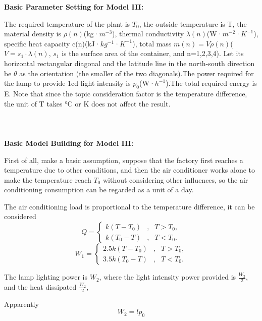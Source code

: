 \textbf{Basic Parameter Setting for Model III:}


The required temperature of the plant is $T_0$, the outside temperature is T, the material density is $\rho(n)$(kg·$m^{-3}$), thermal conductivity $\lambda(n)$(W·$m^{-2}$·$K^{-1}$), specific heat capacity c(n)(kJ·$kg^{-1}$·$K^{-1}$), total mass $m(n)=V\rho(n)$($V=s_1\cdot\lambda(n)$, $s_1$ is the surface area of the container, and n=1,2,3,4). Let its horizontal rectangular diagonal and the latitude line in the north-south direction be $\theta$ as the orientation (the smaller of the two diagonals).The power required for the lamp to provide 1cd light intensity is $p_0$(W·$h^{-1}$).The total required energy is E. Note that since the topic consideration factor is the temperature difference, the unit of T takes °C or K does not affect the result.\\

\\
\\ \hspace*{\fill} \\

\textbf{Basic Model Building for Model III:}


First of all, make a basic assumption, suppose that the factory first reaches a temperature due to other conditions, and then the air conditioner works alone to make the temperature reach $T_0$ without considering other influences, so the air conditioning consumption can be regarded as a unit of a day.

The air conditioning load is proportional to the temperature difference, it can be considered
\begin{equation}\label{e1}
	Q=\left\{
\begin{aligned}\label{el}
k(T-T_0) & , & T>T_0, \\
k(T_0-T) & , & T<T_0.
\end{aligned}
\right.
\end{equation}
\begin{equation}\label{e1}
W_1=\left\{
\begin{aligned}
2.5k(T-T_0) & , & T>T_0, \\
3.5k(T_0-T) & , & T<T_0.
\end{aligned}
\right.
\end{equation}


The lamp lighting power is $W_2$, where the light intensity power provided is $\frac{W_2}{2}$, and the heat dissipated $\frac{W_2}{2}$,

Apparently 
\begin{equation}\label{e1}
	W_2=lp_0
\end{equation}

